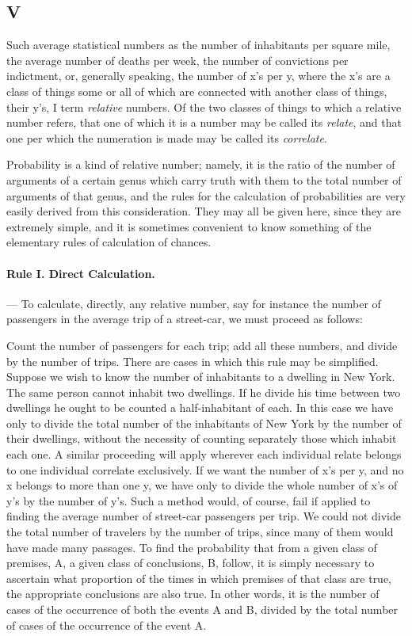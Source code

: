 \subsection*{V}

Such average statistical numbers as the number of inhabitants per square mile, the average number of deaths per week, the number of convictions per indictment, or, generally speaking, the number of x's per y, where the x's are a class of things some or all of which are connected with another class of things, their y's, I term \emph{relative} numbers. Of the two classes of things to which a relative number refers, that one of which it is a number may be called its \emph{relate}, and that one per which the numeration is made may be called its \emph{correlate}.

Probability is a kind of relative number; namely, it is the ratio of the number of arguments of a certain genus which carry truth with them to the total number of arguments of that genus, and the rules for the calculation of probabilities are very easily derived from this consideration. They may all be given here, since they are extremely simple, and it is sometimes convenient to know something of the elementary rules of calculation of chances.

\paragraph{Rule I. Direct Calculation.} --- To calculate, directly, any relative number, say for instance the number of passengers in the average trip of a street-car, we must proceed as follows:

Count the number of passengers for each trip; add all these numbers, and divide by the number of trips. There are cases in which this rule may be simplified. Suppose we wish to know the number of inhabitants to a dwelling in New York. The same person cannot inhabit two dwellings. If he divide his time between two dwellings he ought to be counted a half-inhabitant of each. In this case we have only to divide the total number of the inhabitants of New York by the number of their dwellings, without the necessity of counting separately those which inhabit each one. A similar proceeding will apply wherever each individual relate belongs to one individual correlate exclusively. If we want the number of x's per y, and no x belongs to more than one y, we have only to divide the whole number of x's of y's by the number of y's. Such a method would, of course, fail if applied to finding the average number of street-car passengers per trip. We could not divide the total number of travelers by the number of trips, since many of them would have made many passages. To find the probability that from a given class of premises, A, a given class of conclusions, B, follow, it is simply necessary to ascertain what proportion of the times in which premises of that class are true, the appropriate conclusions are also true. In other words, it is the number of cases of the occurrence of both the events A and B, divided by the total number of cases of the occurrence of the event A.

